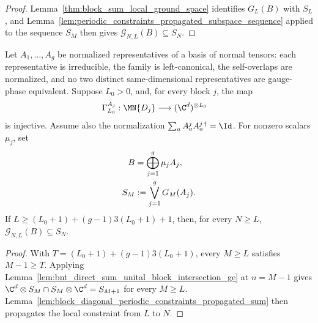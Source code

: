 \begin{proof}
    \leanok
    Lemma~\ref{thm:block_sum_local_ground_space} identifies $G_L(B)$ with
    $S_L$, and Lemma~\ref{lem:periodic_constraints_propagated_subspace_sequence}
    applied to the sequence $S_M$ then gives $\mathcal G_{N,L}(B)\subseteq S_N$.
\end{proof}

\begin{lemma}
    \label{lem:bnt_block_diagonal_periodic_constraints_propagated_sum}
    \leanok
    Let $A_1,\ldots,A_g$ be normalized representatives of a basis of normal
    tensors: each representative is irreducible, the family is left-canonical,
    the self-overlaps are normalized, and no two distinct same-dimensional
    representatives are gauge-phase equivalent. Suppose $L_0>0$, and, for
    every block $j$, the map
    \begin{align}
        \Gamma_{L_0}^{A_j}:\MN{D_j}
         & \longrightarrow(\C^d)^{\otimes L_0}
        \notag
    \end{align}
    is injective. Assume also the normalization
    $\sum_a A^j_aA^{j\,\dagger}_a=\Id$. For nonzero scalars $\mu_j$, set
    \begin{align}
        B   & =\bigoplus_{j=1}^g\mu_jA_j,
        \notag                            \\
        S_M & :=\bigvee_{j=1}^gG_M(A_j).
        \notag
    \end{align}
    If $L\ge (L_0+1)+(g-1)3(L_0+1)+1$, then, for every $N\ge L$,
    $\mathcal G_{N,L}(B)\subseteq S_N$.
\end{lemma}

\begin{proof}
    \leanok
    With $T=(L_0+1)+(g-1)3(L_0+1)$, every $M\ge L$ satisfies $M-1\ge T$.
    Applying Lemma~\ref{lem:bnt_direct_sum_unital_block_intersection_ge} at
    $n=M-1$ gives
    $\C^d\otimes S_M\cap S_M\otimes\C^d =S_{M+1}$
    for every $M\ge L$.
    Lemma~\ref{lem:block_diagonal_periodic_constraints_propagated_sum} then
    propagates the local constraint from $L$ to $N$.
\end{proof}

